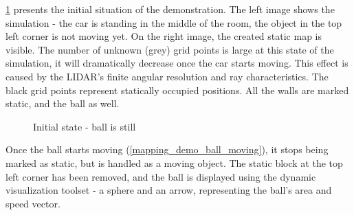 \ref{mapping_demo_start} presents the initial situation of the demonstration. The left image shows the simulation - the car is standing in the middle of the room, the object in the top left corner is not moving yet. On the right image, the created static map is visible. The number of unknown (grey) grid points is large at this state of the simulation, it will dramatically decrease once the car starts moving. This effect is caused by the LIDAR's finite angular resolution and ray characteristics. The black grid points represent statically occupied positions. All the walls are marked static, and the ball as well.

\begin{figure}[!ht]
    \centering
    \caption{Initial state - ball is still}
    \label{mapping_demo_start}
\end{figure}

Once the ball starts moving (\ref{mapping_demo_ball_moving}), it stops being marked as static, but is handled as a moving object. The static block at the top left corner has been removed, and the ball is displayed using the dynamic visualization toolset - a sphere and an arrow, representing the ball's area and speed vector.

